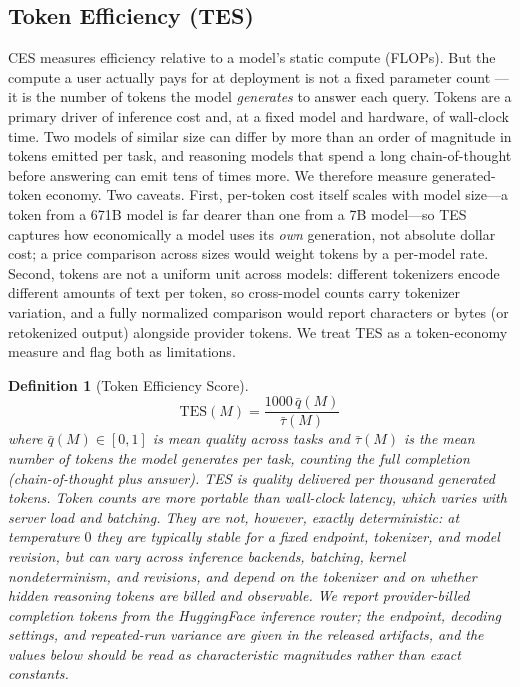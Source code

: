\documentclass[12pt]{article}
\newtheorem{definition}{Definition}
\begin{document}
\subsection{Token Efficiency (TES)}
\label{sec:tes}

CES measures efficiency relative to a model's static compute (FLOPs). But the compute a user actually pays for at deployment is not a fixed parameter count --- it is the number of tokens the model \emph{generates} to answer each query. Tokens are a primary driver of inference cost and, at a fixed model and hardware, of wall-clock time. Two models of similar size can differ by more than an order of magnitude in tokens emitted per task, and reasoning models that spend a long chain-of-thought before answering can emit tens of times more. We therefore measure generated-token economy. Two caveats. First, per-token cost itself scales with model size---a token from a 671B model is far dearer than one from a 7B model---so TES captures how economically a model uses its \emph{own} generation, not absolute dollar cost; a price comparison across sizes would weight tokens by a per-model rate. Second, tokens are not a uniform unit across models: different tokenizers encode different amounts of text per token, so cross-model counts carry tokenizer variation, and a fully normalized comparison would report characters or bytes (or retokenized output) alongside provider tokens. We treat TES as a token-economy measure and flag both as limitations.

\begin{definition}[Token Efficiency Score]
\begin{equation}
\mathrm{TES}(M) = \frac{1000\,\bar{q}(M)}{\bar{\tau}(M)}
\end{equation}
where $\bar{q}(M) \in [0,1]$ is mean quality across tasks and $\bar{\tau}(M)$ is the mean number of tokens the model generates per task, counting the full completion (chain-of-thought plus answer). TES is quality delivered per thousand generated tokens. Token counts are more portable than wall-clock latency, which varies with server load and batching. They are not, however, exactly deterministic: at temperature $0$ they are typically stable for a fixed endpoint, tokenizer, and model revision, but can vary across inference backends, batching, kernel nondeterminism, and revisions, and depend on the tokenizer and on whether hidden reasoning tokens are billed and observable. We report provider-billed completion tokens from the HuggingFace inference router; the endpoint, decoding settings, and repeated-run variance are given in the released artifacts, and the values below should be read as characteristic magnitudes rather than exact constants.
\end{definition}
\end{document}
